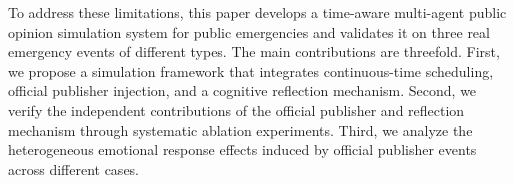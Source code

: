 To address these limitations, this paper develops a time-aware multi-agent public opinion simulation system for public emergencies and validates it on three real emergency events of different types. The main contributions are threefold. First, we propose a simulation framework that integrates continuous-time scheduling, official publisher injection, and a cognitive reflection mechanism. Second, we verify the independent contributions of the official publisher and reflection mechanism through systematic ablation experiments. Third, we analyze the heterogeneous emotional response effects induced by official publisher events across different cases.
